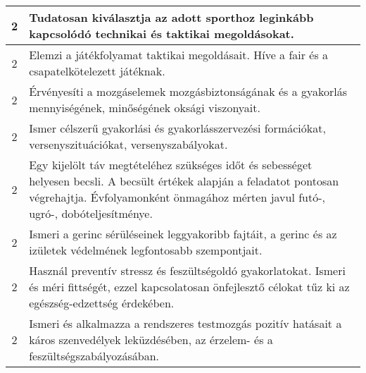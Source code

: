 \begin{longtable}{c | p{} }
                                
                                          2 &  Tudatosan kiválasztja az adott sporthoz leginkább kapcsolódó technikai és taktikai megoldásokat. \\ \hline
                                          2 &  Elemzi a játékfolyamat taktikai megoldásait. Híve a fair és a csapatelkötelezett játéknak. \\ \hline
                                          2 &  Érvényesíti a mozgáselemek mozgásbiztonságának és a gyakorlás mennyiségének, minőségének oksági viszonyait. \\ \hline
                                          2 &  Ismer célszerű gyakorlási és gyakorlásszervezési formációkat, versenyszituációkat, versenyszabályokat. \\ \hline
                                          2 &  Egy kijelölt táv megtételéhez szükséges időt és sebességet helyesen becsli. A becsült értékek alapján a feladatot pontosan végrehajtja. Évfolyamonként önmagához mérten javul futó-, ugró-, dobóteljesítménye. \\ \hline
                                          2 &  Ismeri a gerinc sérüléseinek leggyakoribb fajtáit, a gerinc és az izületek védelmének legfontosabb szempontjait. \\ \hline
                                          2 &  Használ preventív stressz és feszültségoldó gyakorlatokat. Ismeri és méri fittségét, ezzel kapcsolatosan önfejlesztő célokat tűz ki az egészség-edzettség érdekében. \\ \hline
                                          2 &  Ismeri és alkalmazza a rendszeres testmozgás pozitív hatásait a káros szenvedélyek leküzdésében, az érzelem- és a feszültségszabályozásában. \\ \hline
                                      

\end{longtable}
